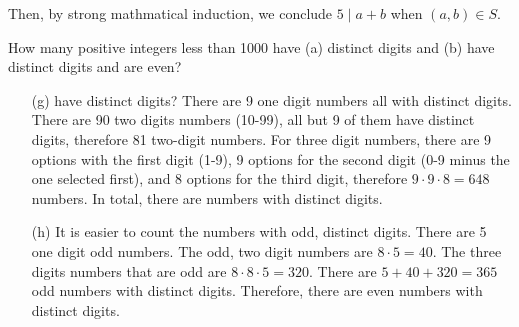 \begin{questions}
\begin{solution}
Then, by strong mathmatical induction, we conclude $5\;|\; a+b$ when $(a,b) \in S$.
\end{solution}



\bonusquestion[2] How many positive integers less than 1000 have (a) distinct digits and (b) have distinct digits and are even?
    \ifprintanswers
        \vspace{-20pt}
    \fi
    \begin{solution}
    \begin{itemize}
    \item[(g)] have distinct digits?
    There are 9 one digit numbers all with distinct digits.  There are 90 two digits numbers (10-99), all but 9 of them have distinct digits, therefore 81 two-digit numbers.  For three digit numbers, there are 9 options with the first digit (1-9), 9 options for the second digit (0-9 minus the one selected first), and 8 options for the third digit, therefore $9 \cdot 9 \cdot 8 = 648$ numbers.  In total, there are   numbers with distinct digits.
    \item[(h)]
    It is easier to count the numbers with odd, distinct digits.  There are 5 one digit odd numbers.  The odd, two digit numbers are $8\cdot5= 40$.  The three digits numbers that are odd are $8 \cdot 8\cdot 5 = 320$.  There are $5 + 40+ 320 = 365$ odd numbers with distinct digits. Therefore, there are  even numbers with distinct digits.
    \end{itemize}
    \end{solution}


\end{questions}

